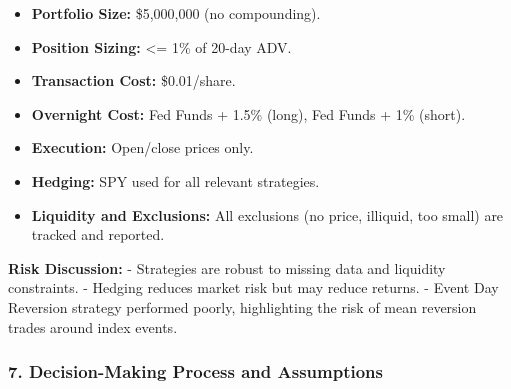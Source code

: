 \documentclass[11pt]{article}
\providecommand{\tightlist}{%
      \setlength{\itemsep}{0pt}\setlength{\parskip}{0pt}}
\begin{document}
\begin{itemize}
\tightlist
\item
  \textbf{Portfolio Size:} \$5,000,000 (no compounding).
\item
  \textbf{Position Sizing:} \textless= 1\% of 20-day ADV.
\item
  \textbf{Transaction Cost:} \$0.01/share.
\item
  \textbf{Overnight Cost:} Fed Funds + 1.5\% (long), Fed Funds + 1\%
  (short).
\item
  \textbf{Execution:} Open/close prices only.
\item
  \textbf{Hedging:} SPY used for all relevant strategies.
\item
  \textbf{Liquidity and Exclusions:} All exclusions (no price, illiquid,
  too small) are tracked and reported.
\end{itemize}

\textbf{Risk Discussion:} - Strategies are robust to missing data and
liquidity constraints. - Hedging reduces market risk but may reduce
returns. - Event Day Reversion strategy performed poorly, highlighting
the risk of mean reversion trades around index events.

\subsubsection*{7. Decision-Making Process and
Assumptions}\label{decision-making-process-and-assumptions}
\end{document}
